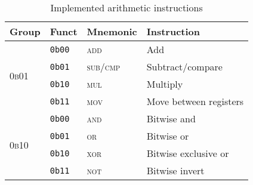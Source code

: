 \begin{table}[h]
    \centering
    \begin{tabular}{|l l l l|}
        \hline
        \textbf{Group} & \textbf{Funct} & \textbf{Mnemonic} & \textbf{Instruction} \\
        \hline
        \multirow{4}{*}{\textsc{0b01}}
            & \texttt{0b00} & \textsc{add} & Add\\
            & \texttt{0b01} & \textsc{sub/cmp} & Subtract/compare\\
            & \texttt{0b10} & \textsc{mul} & Multiply\\
            & \texttt{0b11} & \textsc{mov} & Move between registers\\
        \hline
        \multirow{4}{*}{\textsc{0b10}} 
            & \texttt{0b00} & \textsc{and} & Bitwise and\\
            & \texttt{0b01} & \textsc{or} & Bitwise or\\
            & \texttt{0b10} & \textsc{xor} & Bitwise exclusive or\\
            & \texttt{0b11} & \textsc{not} & Bitwise invert\\
        \hline
    \end{tabular}

    \caption{Implemented arithmetic instructions}
    \label{tab:arith_instrs}
\end{table}
